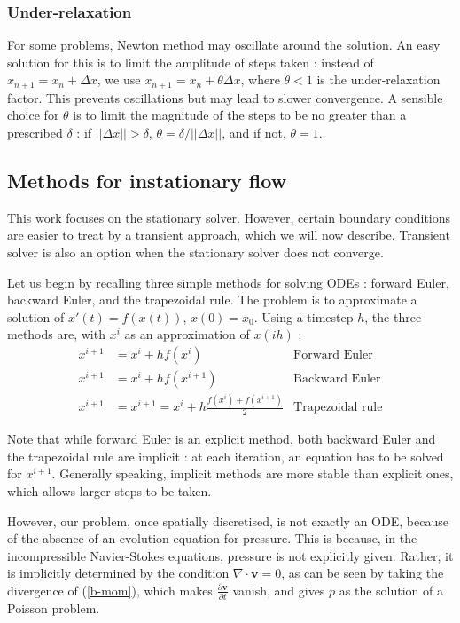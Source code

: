 \documentclass[12pt]{article}
\newcommand{\vb}[1]{\ensuremath{\boldsymbol #1}}
\begin{document}
\subsubsection{Under-relaxation}
For some problems, Newton method may oscillate around the solution. An
easy solution for this is to limit the amplitude of steps taken :
instead of $x_{n+1} = x_n + \Delta x$, we use $x_{n+1} = x_n +\theta
\Delta x$, where $\theta < 1$ is the under-relaxation factor. This
prevents oscillations but may lead to slower convergence. A sensible
choice for $\theta$ is to limit the magnitude of the steps to be no
greater than a prescribed $\delta$ : if $||\Delta x|| > \delta$,
$\theta = \delta / ||\Delta x||$, and if not, $\theta = 1$.

\subsection{Methods for instationary flow}
This work focuses on the stationary solver. However, certain boundary
conditions are easier to treat by a transient approach, which we will
now describe. Transient solver is also an option when the stationary
solver does not converge.

Let us begin by recalling three simple methods for solving ODEs :
forward Euler, backward Euler, and the trapezoidal rule. The problem
is to approximate a solution of $x'(t) = f(x(t))$, $x(0) =
x_0$. Using a timestep $h$, the three methods
are, with $x^i$ as an approximation of $x(i h)$ :
\begin{align}
  \label{fe}
  x^{i+1} &= x^i + h f(x^i) & \text{Forward Euler}\\
  \label{be}
  x^{i+1} &= x^i + h f(x^{i+1}) & \text{Backward Euler}\\
  \label{tr}
  x^{i+1} &= x^{i+1} = x^i + h \frac{f(x^i) + f(x^{i+1})}{2}&
  \text{Trapezoidal rule}
\end{align}

Note that while forward Euler is an explicit method, both backward
Euler and the trapezoidal rule are implicit : at each iteration, an
equation has to be solved for $x^{i+1}$. Generally speaking, implicit
methods are more stable than explicit ones, which allows larger
steps to be taken.

However, our problem, once spatially discretised, is not exactly an
ODE, because of the absence of an evolution equation for
pressure. This is because, in the incompressible Navier-Stokes
equations, pressure is not explicitly given. Rather, it is
implicitly determined by the condition $\nabla \cdot \vb{v} = 0$, as
can be seen by taking the divergence of (\ref{b-mom}), which makes
$\frac{\partial \vb{v}}{\partial t}$ vanish, and gives $p$ as the
solution of a Poisson problem.
\end{document}

